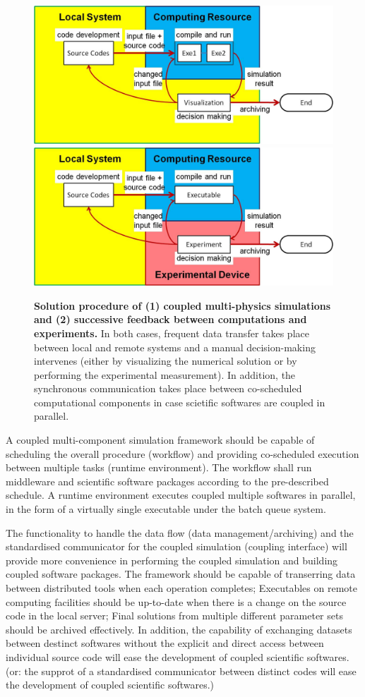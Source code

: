 \documentclass[10pt,conference]{IEEEtran}
\begin{document}
\begin{figure}[ht]
\centering
\includegraphics[width=0.8\linewidth]{Flow_Multiphysics_Simulation.jpg}
\vskip 0.2cm
\includegraphics[width=0.8\linewidth]{Flow_Exp_and_Comp.jpg}
\vskip-0.2cm
\caption{\small 
{\bf Solution procedure of (1) coupled multi-physics simulations and 
(2) successive feedback between computations and experiments.} 
In both cases, frequent data transfer takes place between local and 
remote systems and a manual decision-making intervenes (either by 
visualizing the numerical solution or by performing the experimental 
measurement). In addition, the synchronous communication takes place
between co-scheduled computational components in case scietific 
softwares are coupled in parallel.}
\label{Fig:Overall_Flow}
\end{figure}


A coupled multi-component simulation framework should be capable of 
scheduling the overall procedure (workflow) and providing co-scheduled 
execution between multiple tasks (runtime environment). The workflow 
shall run middleware and scientific software packages according to the 
pre-described schedule. A runtime environment executes coupled multiple 
softwares in parallel, in the form of a virtually single executable 
under the batch queue system.

The functionality to handle the data flow (data management/archiving) and the standardised communicator for the coupled simulation (coupling interface) will provide more convenience in performing the coupled simulation and building coupled software packages. The framework should be capable of transerring data between distributed tools when each operation completes; Executables on remote computing facilities should be up-to-date when there is a change on the source code in the local server; Final solutions from multiple different parameter sets should be archived effectively. In addition, the capability of exchanging datasets between destinct softwares without the explicit and direct access between individual source code will ease the development of coupled scientific softwares. (or: the supprot of a standardised communicator between distinct codes will ease the development of coupled scientific softwares.)
\end{document}
